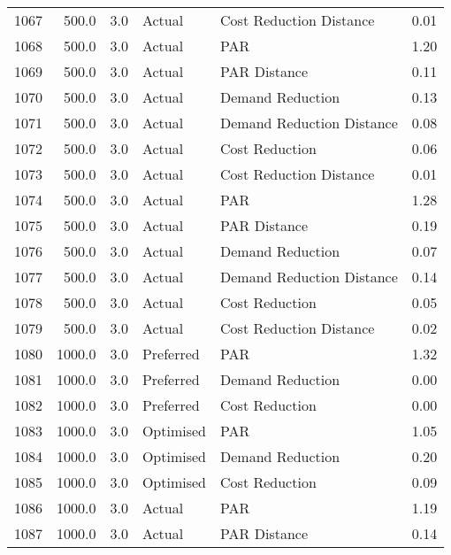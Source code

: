\begin{longtable}{lrrllr}
1067 &        500.0 &     3.0 &         Actual &    Cost Reduction Distance &   0.01 \\
1068 &        500.0 &     3.0 &         Actual &                        PAR &   1.20 \\
1069 &        500.0 &     3.0 &         Actual &               PAR Distance &   0.11 \\
1070 &        500.0 &     3.0 &         Actual &           Demand Reduction &   0.13 \\
1071 &        500.0 &     3.0 &         Actual &  Demand Reduction Distance &   0.08 \\
1072 &        500.0 &     3.0 &         Actual &             Cost Reduction &   0.06 \\
1073 &        500.0 &     3.0 &         Actual &    Cost Reduction Distance &   0.01 \\
1074 &        500.0 &     3.0 &         Actual &                        PAR &   1.28 \\
1075 &        500.0 &     3.0 &         Actual &               PAR Distance &   0.19 \\
1076 &        500.0 &     3.0 &         Actual &           Demand Reduction &   0.07 \\
1077 &        500.0 &     3.0 &         Actual &  Demand Reduction Distance &   0.14 \\
1078 &        500.0 &     3.0 &         Actual &             Cost Reduction &   0.05 \\
1079 &        500.0 &     3.0 &         Actual &    Cost Reduction Distance &   0.02 \\
1080 &       1000.0 &     3.0 &      Preferred &                        PAR &   1.32 \\
1081 &       1000.0 &     3.0 &      Preferred &           Demand Reduction &   0.00 \\
1082 &       1000.0 &     3.0 &      Preferred &             Cost Reduction &   0.00 \\
1083 &       1000.0 &     3.0 &      Optimised &                        PAR &   1.05 \\
1084 &       1000.0 &     3.0 &      Optimised &           Demand Reduction &   0.20 \\
1085 &       1000.0 &     3.0 &      Optimised &             Cost Reduction &   0.09 \\
1086 &       1000.0 &     3.0 &         Actual &                        PAR &   1.19 \\
1087 &       1000.0 &     3.0 &         Actual &               PAR Distance &   0.14 \\

\end{longtable}
